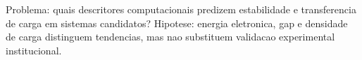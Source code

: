 Problema: quais descritores computacionais predizem estabilidade e transferencia de carga em sistemas candidatos? Hipotese: energia eletronica, gap e densidade de carga distinguem tendencias, mas nao substituem validacao experimental institucional.
